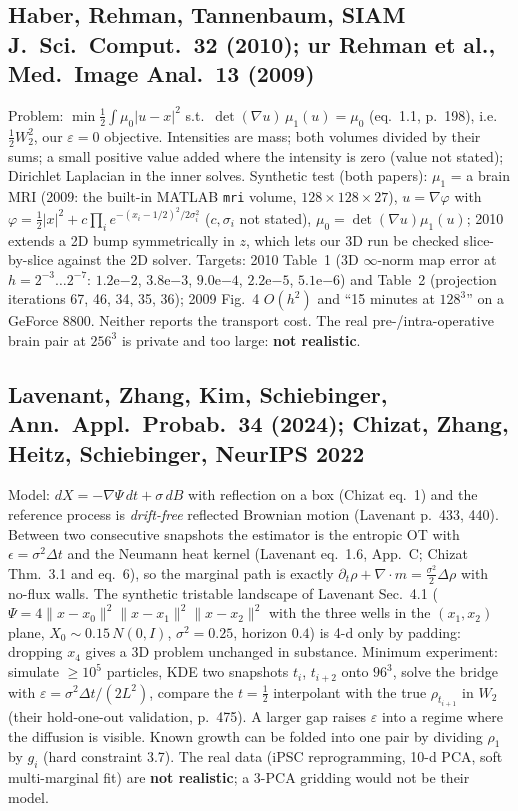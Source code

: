 \documentclass[11pt]{article}
\newcommand{\eps}{\varepsilon}
\newcommand{\code}[1]{\texttt{#1}}
\newcommand{\dv}{\nabla\cdot}
\newcommand{\no}{\textcolor{BrickRed}{\textbf{not realistic}}}
\begin{document}
\subsection{Haber, Rehman, Tannenbaum, SIAM J.\ Sci.\ Comput.\ 32 (2010); ur Rehman et al., Med.\ Image Anal.\ 13 (2009)}
Problem: $\min\tfrac12\int\mu_0|u-x|^2$ s.t.\ $\det(\nabla u)\,\mu_1(u)=\mu_0$ (eq.~1.1, p.~198), i.e.\ $\tfrac12W_2^2$, our $\eps=0$ objective. Intensities are mass; both volumes divided by their sums; a small positive value added where the intensity is zero (value not stated); Dirichlet Laplacian in the inner solves. Synthetic test (both papers): $\mu_1$ = a brain MRI (2009: the built-in MATLAB \code{mri} volume, $128\times128\times27$), $u=\nabla\varphi$ with $\varphi=\tfrac12|x|^2+c\prod_i e^{-(x_i-1/2)^2/2\sigma_i^2}$ ($c,\sigma_i$ not stated), $\mu_0=\det(\nabla u)\mu_1(u)$; 2010 extends a 2D bump symmetrically in $z$, which lets our 3D run be checked slice-by-slice against the 2D solver. Targets: 2010 Table~1 (3D $\infty$-norm map error at $h=2^{-3}\ldots2^{-7}$: $1.2$e$-2$, $3.8$e$-3$, $9.0$e$-4$, $2.2$e$-5$, $5.1$e$-6$) and Table~2 (projection iterations 67, 46, 34, 35, 36); 2009 Fig.~4 $O(h^2)$ and ``15 minutes at $128^3$'' on a GeForce 8800. Neither reports the transport cost. The real pre-/intra-operative brain pair at $256^3$ is private and too large: \no.

\subsection{Lavenant, Zhang, Kim, Schiebinger, Ann.\ Appl.\ Probab.\ 34 (2024); Chizat, Zhang, Heitz, Schiebinger, NeurIPS 2022}
Model: $dX=-\nabla\Psi\,dt+\sigma\,dB$ with reflection on a box (Chizat eq.~1) and the reference process is \emph{drift-free} reflected Brownian motion (Lavenant p.~433, 440). Between two consecutive snapshots the estimator is the entropic OT with $\epsilon=\sigma^2\Delta t$ and the Neumann heat kernel (Lavenant eq.~1.6, App.~C; Chizat Thm.~3.1 and eq.~6), so the marginal path is exactly $\partial_t\rho+\dv m=\tfrac{\sigma^2}{2}\Delta\rho$ with no-flux walls. The synthetic tristable landscape of Lavenant Sec.~4.1 ($\Psi=4\|x-x_0\|^2\|x-x_1\|^2\|x-x_2\|^2$ with the three wells in the $(x_1,x_2)$ plane, $X_0\sim0.15\,N(0,I)$, $\sigma^2=0.25$, horizon $0.4$) is 4-d only by padding: dropping $x_4$ gives a 3D problem unchanged in substance. Minimum experiment: simulate $\ge10^5$ particles, KDE two snapshots $t_i$, $t_{i+2}$ onto $96^3$, solve the bridge with $\eps=\sigma^2\Delta t/(2L^2)$, compare the $t=\tfrac12$ interpolant with the true $\rho_{t_{i+1}}$ in $W_2$ (their hold-one-out validation, p.~475). A larger gap raises $\eps$ into a regime where the diffusion is visible. Known growth can be folded into one pair by dividing $\rho_1$ by $g_i$ (hard constraint 3.7). The real data (iPSC reprogramming, 10-d PCA, soft multi-marginal fit) are \no; a 3-PCA gridding would not be their model.
\end{document}
